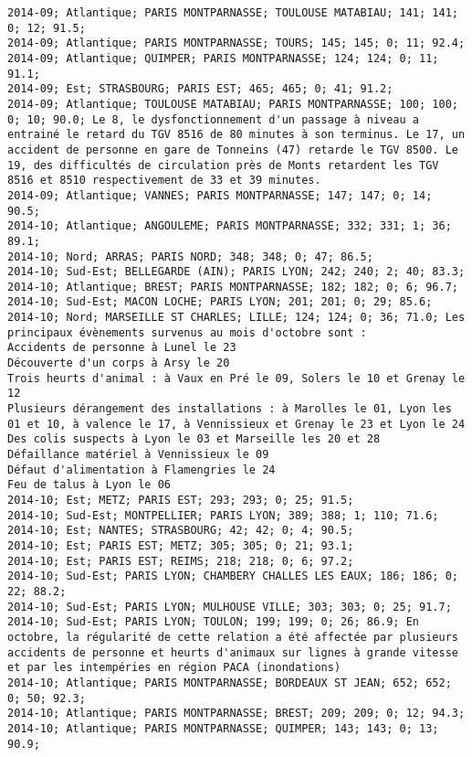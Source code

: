 \documentclass{article}
\begin{document}
\begin{Verbatim}[commandchars=\\\{\}]
2014-09; Atlantique; PARIS MONTPARNASSE; TOULOUSE MATABIAU; 141; 141; 0; 12; 91.5; 
2014-09; Atlantique; PARIS MONTPARNASSE; TOURS; 145; 145; 0; 11; 92.4; 
2014-09; Atlantique; QUIMPER; PARIS MONTPARNASSE; 124; 124; 0; 11; 91.1; 
2014-09; Est; STRASBOURG; PARIS EST; 465; 465; 0; 41; 91.2; 
2014-09; Atlantique; TOULOUSE MATABIAU; PARIS MONTPARNASSE; 100; 100; 0; 10; 90.0; Le 8, le dysfonctionnement d'un passage à niveau a entrainé le retard du TGV 8516 de 80 minutes à son terminus. Le 17, un accident de personne en gare de Tonneins (47) retarde le TGV 8500. Le 19, des difficultés de circulation près de Monts retardent les TGV 8516 et 8510 respectivement de 33 et 39 minutes.
2014-09; Atlantique; VANNES; PARIS MONTPARNASSE; 147; 147; 0; 14; 90.5; 
2014-10; Atlantique; ANGOULEME; PARIS MONTPARNASSE; 332; 331; 1; 36; 89.1; 
2014-10; Nord; ARRAS; PARIS NORD; 348; 348; 0; 47; 86.5; 
2014-10; Sud-Est; BELLEGARDE (AIN); PARIS LYON; 242; 240; 2; 40; 83.3; 
2014-10; Atlantique; BREST; PARIS MONTPARNASSE; 182; 182; 0; 6; 96.7; 
2014-10; Sud-Est; MACON LOCHE; PARIS LYON; 201; 201; 0; 29; 85.6; 
2014-10; Nord; MARSEILLE ST CHARLES; LILLE; 124; 124; 0; 36; 71.0; Les principaux évènements survenus au mois d'octobre sont :
Accidents de personne à Lunel le 23
Découverte d'un corps à Arsy le 20
Trois heurts d'animal : à Vaux en Pré le 09, Solers le 10 et Grenay le 12
Plusieurs dérangement des installations : à Marolles le 01, Lyon les 01 et 10, à valence le 17, à Vennissieux et Grenay le 23 et Lyon le 24
Des colis suspects à Lyon le 03 et Marseille les 20 et 28 
Défaillance matériel à Vennissieux le 09
Défaut d'alimentation à Flamengries le 24
Feu de talus à Lyon le 06
2014-10; Est; METZ; PARIS EST; 293; 293; 0; 25; 91.5; 
2014-10; Sud-Est; MONTPELLIER; PARIS LYON; 389; 388; 1; 110; 71.6; 
2014-10; Est; NANTES; STRASBOURG; 42; 42; 0; 4; 90.5; 
2014-10; Est; PARIS EST; METZ; 305; 305; 0; 21; 93.1; 
2014-10; Est; PARIS EST; REIMS; 218; 218; 0; 6; 97.2; 
2014-10; Sud-Est; PARIS LYON; CHAMBERY CHALLES LES EAUX; 186; 186; 0; 22; 88.2; 
2014-10; Sud-Est; PARIS LYON; MULHOUSE VILLE; 303; 303; 0; 25; 91.7; 
2014-10; Sud-Est; PARIS LYON; TOULON; 199; 199; 0; 26; 86.9; En octobre, la régularité de cette relation a été affectée par plusieurs accidents de personne et heurts d'animaux sur lignes à grande vitesse et par les intempéries en région PACA (inondations)
2014-10; Atlantique; PARIS MONTPARNASSE; BORDEAUX ST JEAN; 652; 652; 0; 50; 92.3; 
2014-10; Atlantique; PARIS MONTPARNASSE; BREST; 209; 209; 0; 12; 94.3; 
2014-10; Atlantique; PARIS MONTPARNASSE; QUIMPER; 143; 143; 0; 13; 90.9; 

\end{Verbatim}
\end{document}
